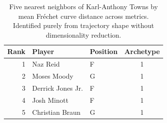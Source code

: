 \begin{table}[htbp]
  \centering\small
  \begin{tabular}{rllc}
    \toprule
    Rank & Player & Position & Archetype \\
    \midrule
    1 & Naz Reid & F & 1 \\
    2 & Moses Moody & G & 1 \\
    3 & Derrick Jones Jr. & F & 1 \\
    4 & Josh Minott & F & 1 \\
    5 & Christian Braun & G & 1 \\
    \bottomrule
  \end{tabular}
  \caption{Five nearest neighbors of Karl-Anthony Towns by mean Fr\'{e}chet curve distance across metrics. Identified purely from trajectory shape without dimensionality reduction.}
  \label{tab:Karl_Anthony_Towns_frechet_curve_neighbors}
\end{table}

